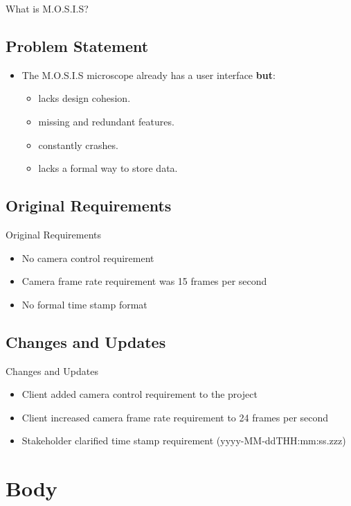 \documentclass[17pt, aspectratio=169]{beamer}
\begin{document}
\begin{frame}{What is M.O.S.I.S?}
\begin{figure}
\end{figure}
\end{frame}
\subsection{Problem Statement}
\begin{frame}

\begin{itemize}
		\item The M.O.S.I.S microscope already has a user interface \textbf{but}:
		      \begin{itemize}
			      \item lacks design cohesion.
			      \item missing and redundant features.
			      \item constantly crashes.
			      \item lacks a formal way to store data.
		      \end{itemize}
	\end{itemize}
\end{frame}
\subsection*{Original Requirements}
\begin{frame}{Original Requirements}
	\begin{itemize}
		\item No camera control requirement
		\item Camera frame rate requirement was 15 frames per second
		\item No formal time stamp format
	\end{itemize}
\end{frame}
\subsection*{Changes and Updates}
\begin{frame}{Changes and Updates}
	\begin{itemize}
		\item Client added camera control requirement to the project
		\item Client increased camera frame rate requirement to 24 frames per second
		\item Stakeholder clarified time stamp requirement (yyyy-MM-ddTHH:mm:ss.zzz)
	\end{itemize}
\end{frame}
\section{Body}
\end{document}
